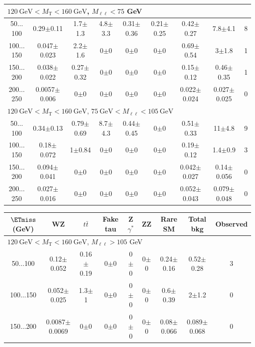 \begin{landscape}
\begin{table}
\begin{center}
\begin{tabular}{| c | c c c c c c  | c  c | }
\hline\hline
\multicolumn{7}{l}{$120~\mathrm{GeV} < M_{\text{T}} < 160~\mathrm{GeV}$, $M_{\ell\ell} < 75$ GeV}\\\hline\hline
50$\dots$100&0.29$\pm$0.11&1.7$\pm$1.3&4.8$\pm$3.3&0.31$\pm$0.36&0.21$\pm$0.25&0.42$\pm$0.27&7.8$\pm$4.1&8\\
100$\dots$150&0.047$\pm$0.023&2.2$\pm$1.6&0$\pm$0&0$\pm$0&0$\pm$0&0.69$\pm$0.54&3$\pm$1.8&1\\
150$\dots$200&0.038$\pm$0.022&0.27$\pm$0.32&0$\pm$0&0$\pm$0&0$\pm$0&0.15$\pm$0.12&0.46$\pm$0.35&1\\
200$\dots$250&0.0057$\pm$0.006&0$\pm$0&0$\pm$0&0$\pm$0&0$\pm$0&0.022$\pm$0.024&0.027$\pm$0.025&0\\
\hline\hline
\multicolumn{7}{l}{$120~\mathrm{GeV} < M_{\text{T}} < 160~\mathrm{GeV}$, $75~\mathrm{GeV} < M_{\ell\ell} < 105~\mathrm{GeV}$}\\\hline\hline
50$\dots$100&0.34$\pm$0.13&0.79$\pm$0.69&8.7$\pm$4.3&0.44$\pm$0.45&0$\pm$0&0.51$\pm$0.33&11$\pm$4.8&9\\
100$\dots$150&0.18$\pm$0.072&1$\pm$0.84&0$\pm$0&0$\pm$0&0$\pm$0&0.19$\pm$0.12&1.4$\pm$0.9&3\\
150$\dots$200&0.094$\pm$0.041&0$\pm$0&0$\pm$0&0$\pm$0&0$\pm$0&0.042$\pm$0.027&0.14$\pm$0.056&0\\
200$\dots$250&0.027$\pm$0.016&0$\pm$0&0$\pm$0&0$\pm$0&0$\pm$0&0.052$\pm$0.043&0.079$\pm$0.048&0\\
\hline\hline
\end{tabular}
\end{center}
\end{table}
\begin{table}
\begin{center}
\begin{tabular}{| c | c c c c c c  | c  c | }\hline\hline
$\ETmiss$ (GeV) & WZ & $t\bar{t}$ & Fake tau & Z$\gamma^*$ & ZZ & Rare SM & Total bkg & Observed\\\hline\hline
\multicolumn{7}{l}{$120~\mathrm{GeV} < M_{\text{T}} < 160~\mathrm{GeV}$, $M_{\ell\ell} > 105$ GeV}\\\hline\hline
50$\dots$100&0.12$\pm$0.052&0.16$\pm$0.19&0$\pm$0&0$\pm$0&0$\pm$0&0.24$\pm$0.16&0.52$\pm$0.28&3\\
100$\dots$150&0.052$\pm$0.025&1.3$\pm$1&0$\pm$0&0$\pm$0&0$\pm$0&0.6$\pm$0.39&2$\pm$1.2&0\\
150$\dots$200&0.0087$\pm$0.0069&0$\pm$0&0$\pm$0&0$\pm$0&0$\pm$0&0.08$\pm$0.066&0.089$\pm$0.068&0\\

\end{tabular}
\end{center}
\end{table}
\end{landscape}
